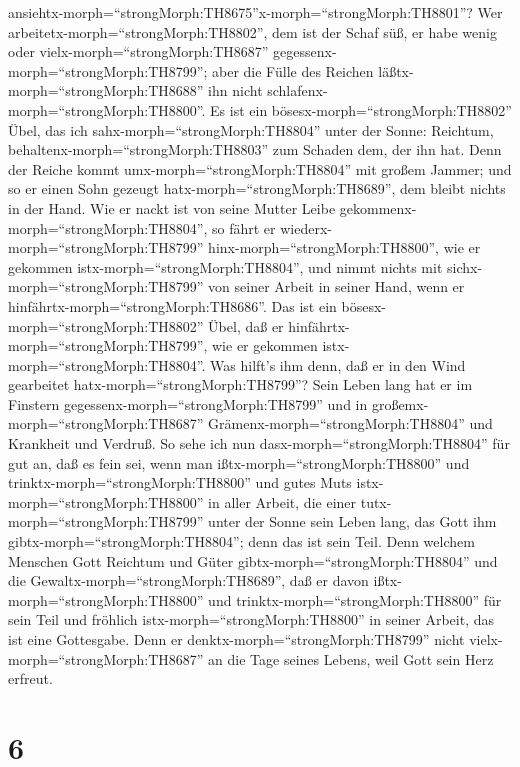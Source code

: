 ansiehtx-morph=``strongMorph:TH8675''x-morph=``strongMorph:TH8801''?
 Wer arbeitetx-morph=``strongMorph:TH8802'', dem ist der
Schaf süß, er habe wenig oder vielx-morph=``strongMorph:TH8687''
gegessenx-morph=``strongMorph:TH8799''; aber die Fülle des Reichen
läßtx-morph=``strongMorph:TH8688'' ihn nicht
schlafenx-morph=``strongMorph:TH8800''.  Es ist ein
bösesx-morph=``strongMorph:TH8802'' Übel, das ich
sahx-morph=``strongMorph:TH8804'' unter der Sonne: Reichtum,
behaltenx-morph=``strongMorph:TH8803'' zum Schaden dem, der ihn hat.
 Denn der Reiche kommt umx-morph=``strongMorph:TH8804'' mit
großem Jammer; und so er einen Sohn gezeugt
hatx-morph=``strongMorph:TH8689'', dem bleibt nichts in der Hand.
 Wie er nackt ist von seine Mutter Leibe
gekommenx-morph=``strongMorph:TH8804'', so fährt er
wiederx-morph=``strongMorph:TH8799'' hinx-morph=``strongMorph:TH8800'',
wie er gekommen istx-morph=``strongMorph:TH8804'', und nimmt nichts mit
sichx-morph=``strongMorph:TH8799'' von seiner Arbeit in seiner Hand,
wenn er hinfährtx-morph=``strongMorph:TH8686''.  Das ist
ein bösesx-morph=``strongMorph:TH8802'' Übel, daß er
hinfährtx-morph=``strongMorph:TH8799'', wie er gekommen
istx-morph=``strongMorph:TH8804''. Was hilft's ihm denn, daß er in den
Wind gearbeitet hatx-morph=``strongMorph:TH8799''?  Sein
Leben lang hat er im Finstern gegessenx-morph=``strongMorph:TH8799'' und
in großemx-morph=``strongMorph:TH8687''
Grämenx-morph=``strongMorph:TH8804'' und Krankheit und Verdruß.
 So sehe ich nun dasx-morph=``strongMorph:TH8804'' für gut
an, daß es fein sei, wenn man ißtx-morph=``strongMorph:TH8800'' und
trinktx-morph=``strongMorph:TH8800'' und gutes Muts
istx-morph=``strongMorph:TH8800'' in aller Arbeit, die einer
tutx-morph=``strongMorph:TH8799'' unter der Sonne sein Leben lang, das
Gott ihm gibtx-morph=``strongMorph:TH8804''; denn das ist sein Teil.
 Denn welchem Menschen Gott Reichtum und Güter
gibtx-morph=``strongMorph:TH8804'' und die
Gewaltx-morph=``strongMorph:TH8689'', daß er davon
ißtx-morph=``strongMorph:TH8800'' und
trinktx-morph=``strongMorph:TH8800'' für sein Teil und fröhlich
istx-morph=``strongMorph:TH8800'' in seiner Arbeit, das ist eine
Gottesgabe.  Denn er denktx-morph=``strongMorph:TH8799''
nicht vielx-morph=``strongMorph:TH8687'' an die Tage seines Lebens, weil
Gott sein Herz erfreut.

\hypertarget{section-5}{%
\section{6}\label{section-5}}

